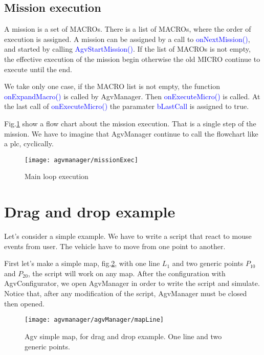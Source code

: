 \subsection{Mission execution}
A mission is a set of MACROs. There is a list of MACROs, where the order of execution is assigned.
A mission can be assigned by a call to \textcolor{blue}{onNextMission()}, and started by calling \textcolor{blue}{AgvStartMission()}.
If the list of MACROs is not empty, the effective execution of the mission begin otherwise the old MICRO continue to execute until the end.

We take only one case, if the MACRO list is not empty, the function \textcolor{blue}{onExpandMacro()} is called by AgvManager.
Then \textcolor{blue}{onExecuteMicro()} is called. At the last call of \textcolor{blue}{onExecuteMicro()} the paramater \textcolor{blue}{bLastCall} is assigned to true.

Fig.\ref{fig:missionExec} show a flow chart about the mission execution.
That is a single step of the mission. We have to imagine that AgvManager continue to call the flowchart like a plc, cyclically.

\begin{figure}
	\centering\texttt{[image: agvmanager/missionExec]}
	\caption{Main loop execution}
	\label{fig:missionExec}
\end{figure}

\section{Drag and drop example}
Let's consider a simple example. We have to write a script that react to mouse events from user. The vehicle have to move from one point to another.

First let's make a simple map, fig.\ref{fig:mapLine}, with one line $L_{1}$ and two generic points $P_{10}$ and $P_{20}$, the script will work on any map.
After the configuration with AgvConfigurator, we open AgvManager in order to write the script and simulate.
Notice that, after any modification of the script, AgvManager must be closed then opened.\\

\begin{figure}
	\centering\texttt{[image: agvmanager/agvManager/mapLine]}
	\caption{Agv simple map, for drag and drop example. One line and two generic points.}
	\label{fig:mapLine}
\end{figure}


